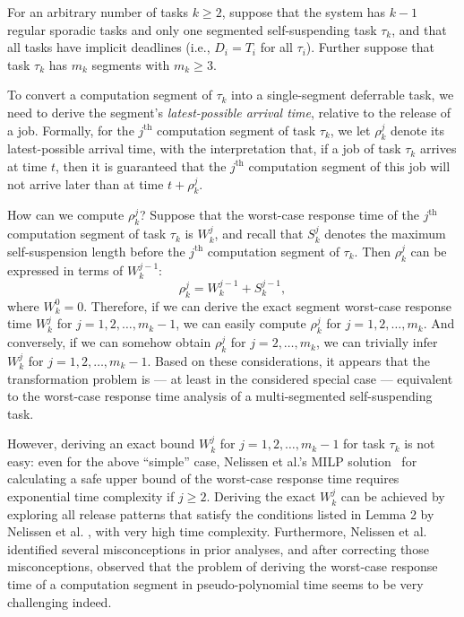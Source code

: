 For an arbitrary number of tasks $k \geq 2$, 
suppose that the system has $k-1$ regular sporadic tasks and only one segmented self-suspending task $\tau_k$, and that all tasks have implicit deadlines (i.e., $D_i = T_i$ for all $\tau_i$). Further suppose that task $\tau_k$ has $m_k$ segments with $m_k \geq 3$.  

To  convert a computation segment of $\tau_k$ into a single-segment deferrable task, we need to derive the segment's \emph{latest-possible arrival time}, relative to the release of a job. Formally,  for the $j^{\mathrm{th}}$ computation segment of task $\tau_k$, we let $\rho_k^j$ denote its latest-possible arrival time, with the interpretation that, if a job of task $\tau_k$ arrives at time $t$, then  it is guaranteed that the $j^{\mathrm{th}}$ computation segment of this job will not arrive later than at time $t+\rho_k^j$.

How can we compute $\rho_k^j$? Suppose that the worst-case response time of the $j^{\mathrm{th}}$ computation segment of task $\tau_k$ is $W_k^j$, and recall that $S_k^{j}$ denotes the maximum self-suspension length before the $j^{\mathrm{th}}$ computation segment of $\tau_k$. Then $\rho_k^j$ can be expressed in terms of $W_k^{j-1}$:
$$
	\rho_k^j = W_k^{j-1}+S_k^{j-1},
$$
where $W_k^0 = 0$.  Therefore, if we can derive the exact segment worst-case response time $W_k^j$ for $j=1,2,\ldots,m_k-1$, we can easily compute $\rho_k^j$  for $j=1,2,\ldots,m_k$. And conversely, if we can somehow obtain $\rho_k^j$  for $j=2,\ldots,m_k$, we  can trivially infer $W_k^j$ for $j=1,2,\ldots,m_k-1$.
Based on these considerations, it appears that the transformation problem is  --- at least in the considered special case --- equivalent to the  worst-case response time analysis of a multi-segmented self-suspending task. 

However, deriving an exact bound $W_k^j$ for $j=1,2,\ldots,m_k-1$ for task $\tau_k$ is not easy: 
even for the above ``simple'' case, Nelissen et al.'s MILP solution~\cite{ecrts15nelissen} for calculating a safe upper bound of the worst-case response time requires exponential time complexity if $j \geq 2$. 
Deriving the exact $W_k^j$ can be achieved by exploring all  release patterns that satisfy the conditions listed in Lemma 2 by Nelissen et al. \cite{ecrts15nelissen}, with very high time complexity. 
Furthermore, Nelissen et al. \cite{ecrts15nelissen} identified several misconceptions in prior analyses, and after correcting those misconceptions, observed that the problem of deriving the worst-case response time of a computation segment in pseudo-polynomial time seems to be very challenging indeed.

